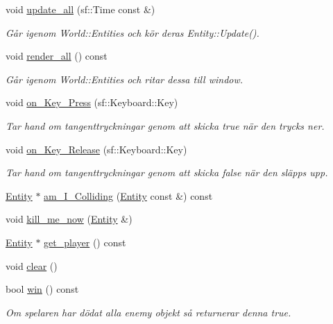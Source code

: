 \begin{DoxyCompactItemize}
\item 
void \hyperlink{classWorld_abe8efb7955edd02cfdae5f99f2e5a346}{update\+\_\+all} (sf\+::\+Time const \&)
\begin{DoxyCompactList}\small\item\em Går igenom World\+::\+Entities och kör deras Entity\+::\+Update(). \end{DoxyCompactList}\item 
void \hyperlink{classWorld_a56d3640e46fef8b3e62538f067e2fbd2}{render\+\_\+all} () const 
\begin{DoxyCompactList}\small\item\em Går igenom World\+::\+Entities och ritar dessa till window. \end{DoxyCompactList}\item 
void \hyperlink{classWorld_adfa428160c22b1e420048bdcacc93733}{on\+\_\+\+Key\+\_\+\+Press} (sf\+::\+Keyboard\+::\+Key)
\begin{DoxyCompactList}\small\item\em Tar hand om tangenttryckningar genom att skicka true när den trycks ner. \end{DoxyCompactList}\item 
void \hyperlink{classWorld_a2162e66648702260f49e0bece2ea67df}{on\+\_\+\+Key\+\_\+\+Release} (sf\+::\+Keyboard\+::\+Key)
\begin{DoxyCompactList}\small\item\em Tar hand om tangenttryckningar genom att skicka false när den släpps upp. \end{DoxyCompactList}\item 
\hyperlink{classEntity}{Entity} $\ast$ \hyperlink{classWorld_a6f3662fed56503455d176e85c2e45292}{am\+\_\+\+I\+\_\+\+Colliding} (\hyperlink{classEntity}{Entity} const \&) const 
\item 
void \hyperlink{classWorld_aba7ebab445704a4db31e9407e894cb3e}{kill\+\_\+me\+\_\+now} (\hyperlink{classEntity}{Entity} \&)
\item 
\hyperlink{classEntity}{Entity} $\ast$ \hyperlink{classWorld_a0b4bf20ce8e70ec398fb40d6366cb222}{get\+\_\+player} () const 
\item 
void \hyperlink{classWorld_a24f6906f2e4f0c761653a8f9e42588a6}{clear} ()
\item 
bool \hyperlink{classWorld_afe79848202c75c3b9e86fc336ba60a2d}{win} () const 
\begin{DoxyCompactList}\small\item\em Om spelaren har dödat alla enemy objekt så returnerar denna true. \end{DoxyCompactList}\item 

\end{DoxyCompactItemize}
